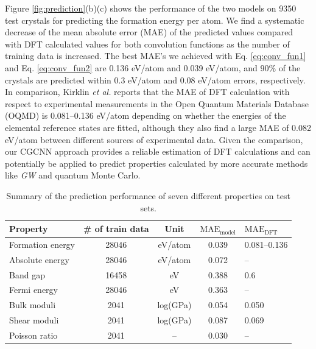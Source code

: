 \documentclass[twocolumn, prl]{revtex4-1}
\begin{document}
Figure \ref{fig:prediction}(b)(c) shows the performance of the two models on 9350 test crystals for predicting the formation energy per atom. We find a systematic decrease of the mean absolute error (MAE) of the predicted values compared with DFT calculated values for both convolution functions as the number of training data is increased. The best MAE's we achieved with Eq. \ref{eq:conv_fun1} and Eq. \ref{eq:conv_fun2} are 0.136 eV/atom and 0.039 eV/atom, and 90\% of the crystals are predicted within 0.3 eV/atom and 0.08 eV/atom errors, respectively. In comparison, Kirklin \textit{et al.} reports that the MAE of DFT calculation with respect to experimental measurements in the Open Quantum Materials Database (OQMD) is 0.081--0.136 eV/atom depending on whether the energies of the elemental reference states are fitted, although they also find a large MAE of 0.082 eV/atom between different sources of experimental data. Given the comparison, our CGCNN approach provides a reliable estimation of DFT calculations and can potentially be applied to predict properties calculated by more accurate methods like \textit{GW}\cite{hybertsen1986electron} and quantum Monte Carlo\cite{foulkes2001quantum}.


\begin{table}%
\caption{Summary of the prediction performance of seven different properties on test sets.\label{tab:predictions}}
\begin{ruledtabular}
\begin{tabular}{p{2cm}cccp{1.8cm}}
  Property    & \# of train data		&	Unit   & $\textrm{MAE}_{\textrm{model}}$   & $\textrm{MAE}_{\textrm{DFT}}$\\
  \hline
  Formation energy & 28046    		&  eV/atom  & 0.039 					&	0.081--0.136\cite{kirklin2015open} \\
  Absolute energy	& 28046			&  eV/atom	& 0.072					&	--\\
  Band gap			& 16458			&  eV		& 0.388					&	0.6\cite{jain2011high}\\
  Fermi energy		& 28046			&  eV		& 0.363					&	--\\
  Bulk moduli		& 2041 			&  log(GPa)	& 0.054					&	0.050\cite{de2015charting}\\
  Shear moduli		& 2041			& log(GPa)	& 0.087					&	0.069\cite{de2015charting}\\
  Poisson ratio		& 2041			& --			& 0.030					&	--\\

\end{tabular}
\end{ruledtabular}
\end{table}
\end{document}
